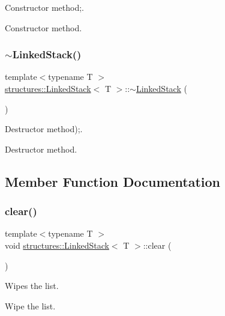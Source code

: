 Constructor method;. 

Constructor method. \mbox{\label{classstructures_1_1LinkedStack_aae17566eb103c92eb22be2e779286f2f}} 
\subsubsection{\texorpdfstring{$\sim$\+Linked\+Stack()}{~LinkedStack()}}
{\footnotesize\ttfamily template$<$typename T $>$ \\
\mbox{\hyperlink{classstructures_1_1LinkedStack}{structures\+::\+Linked\+Stack}}$<$ T $>$\+::$\sim$\mbox{\hyperlink{classstructures_1_1LinkedStack}{Linked\+Stack}} (\begin{DoxyParamCaption}{ }\end{DoxyParamCaption})}



Destructor method);. 

Destructor method. 

\subsection{Member Function Documentation}
\mbox{\label{classstructures_1_1LinkedStack_a56cc909b4a3a0ff7a589f35032ca0ba8}} 
\subsubsection{\texorpdfstring{clear()}{clear()}}
{\footnotesize\ttfamily template$<$typename T $>$ \\
void \mbox{\hyperlink{classstructures_1_1LinkedStack}{structures\+::\+Linked\+Stack}}$<$ T $>$\+::clear (\begin{DoxyParamCaption}{ }\end{DoxyParamCaption})}



Wipes the list. 

Wipe the list. \mbox{\label{classstructures_1_1LinkedStack_ac9704fd697f9c4ed4f7fc4e786114e4f}} 
